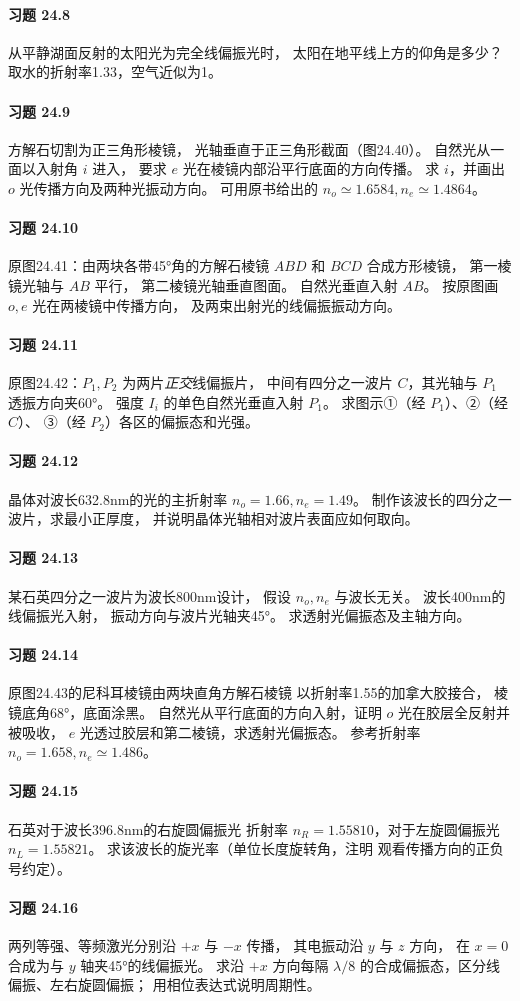 \paragraph{习题 24.8}
从平静湖面反射的太阳光为完全线偏振光时，
太阳在地平线上方的仰角是多少？
取水的折射率1.33，空气近似为1。
\paragraph{习题 24.9}
方解石切割为正三角形棱镜，
光轴垂直于正三角形截面（图24.40）。
自然光从一面以入射角 \(i\) 进入，
要求 \(e\) 光在棱镜内部沿平行底面的方向传播。
求 \(i\)，并画出 \(o\) 光传播方向及两种光振动方向。
可用原书给出的 \(n_o\simeq1.6584,n_e\simeq1.4864\)。
\paragraph{习题 24.10}
原图24.41：由两块各带45°角的方解石棱镜
\(ABD\) 和 \(BCD\) 合成方形棱镜，
第一棱镜光轴与 \(AB\) 平行，
第二棱镜光轴垂直图面。
自然光垂直入射 \(AB\)。
按原图画 \(o,e\) 光在两棱镜中传播方向，
及两束出射光的线偏振振动方向。
\paragraph{习题 24.11}
原图24.42：\(P_1,P_2\) 为两片\emph{正交}线偏振片，
中间有四分之一波片 \(C\)，其光轴与
\(P_1\) 透振方向夹60°。
强度 \(I_i\) 的单色自然光垂直入射 \(P_1\)。
求图示①（经 \(P_1\)）、②（经 \(C\)）、
③（经 \(P_2\)）各区的偏振态和光强。
\paragraph{习题 24.12}
晶体对波长632.8nm的光的主折射率
\(n_o=1.66,n_e=1.49\)。
制作该波长的四分之一波片，求最小正厚度，
并说明晶体光轴相对波片表面应如何取向。
\paragraph{习题 24.13}
某石英四分之一波片为波长800nm设计，
假设 \(n_o,n_e\) 与波长无关。
波长400nm的线偏振光入射，
振动方向与波片光轴夹45°。
求透射光偏振态及主轴方向。
\paragraph{习题 24.14}
原图24.43的尼科耳棱镜由两块直角方解石棱镜
以折射率1.55的加拿大胶接合，
棱镜底角68°，底面涂黑。
自然光从平行底面的方向入射，证明
\(o\) 光在胶层全反射并被吸收，
\(e\) 光透过胶层和第二棱镜，求透射光偏振态。
参考折射率 \(n_o=1.658,n_e\simeq1.486\)。
\paragraph{习题 24.15}
石英对于波长396.8nm的右旋圆偏振光
折射率 \(n_R=1.55810\)，对于左旋圆偏振光
\(n_L=1.55821\)。
求该波长的旋光率（单位长度旋转角，注明
观看传播方向的正负号约定）。
\paragraph{习题 24.16}
两列等强、等频激光分别沿
\(+x\) 与 \(-x\) 传播，
其电振动沿 \(y\) 与 \(z\) 方向，
在 \(x=0\) 合成为与 \(y\) 轴夹45°的线偏振光。
求沿 \(+x\) 方向每隔 \(\lambda/8\)
的合成偏振态，区分线偏振、左右旋圆偏振；
用相位表达式说明周期性。
